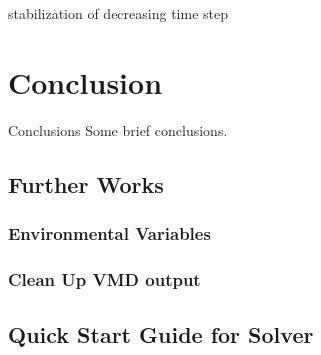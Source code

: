 \documentclass[a4paper,11pt]{article}
\begin{document}
stabilization of decreasing time step
 
 
 \section{Conclusion}
Conclusions Some brief conclusions.
 
\subsection{Further Works}

\subsubsection{Environmental Variables}

\subsubsection{Clean Up VMD output}


\newpage
\begin{appendices}
\section{Quick Start Guide for Solver}
\end{appendices}
\end{document}
